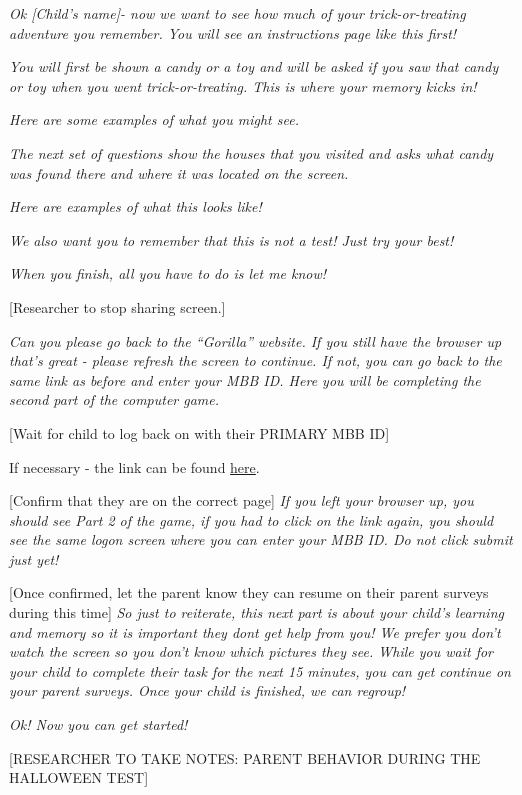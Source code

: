 \documentclass[
]{book}
\begin{document}
\emph{Ok {[}Child's name{]}- now we want to see how much of your trick-or-treating adventure you remember. You will see an instructions page like this first!}

\emph{You will first be shown a candy or a toy and will be asked if you saw that candy or toy when you went trick-or-treating. This is where your memory kicks in!}

\emph{Here are some examples of what you might see.}

\emph{The next set of questions show the houses that you visited and asks what candy was found there and where it was located on the screen.}

\emph{Here are examples of what this looks like!}

\emph{We also want you to remember that this is not a test! Just try your best!}

\emph{When you finish, all you have to do is let me know!}

{[}Researcher to stop sharing screen.{]}

\emph{Can you please go back to the ``Gorilla'' website. If you still have the browser up that's great - please refresh the screen to continue. If not, you can go back to the same link as before and enter your MBB ID. Here you will be completing the second part of the computer game.}

{[}Wait for child to log back on with their PRIMARY MBB ID{]}

If necessary - the link can be found \href{https://research.sc/participant/login/20451/publicid}{here}.

{[}Confirm that they are on the correct page{]} \emph{If you left your browser up, you should see Part 2 of the game, if you had to click on the link again, you should see the same logon screen where you can enter your MBB ID. Do not click submit just yet!}

{[}Once confirmed, let the parent know they can resume on their parent surveys during this time{]} \emph{So just to reiterate, this next part is about your child's learning and memory so it is important they dont get help from you! We prefer you don't watch the screen so you don't know which pictures they see. While you wait for your child to complete their task for the next 15 minutes, you can get continue on your parent surveys. Once your child is finished, we can regroup!}

\emph{Ok! Now you can get started!}

{[}RESEARCHER TO TAKE NOTES: PARENT BEHAVIOR DURING THE HALLOWEEN TEST{]}
\end{document}
